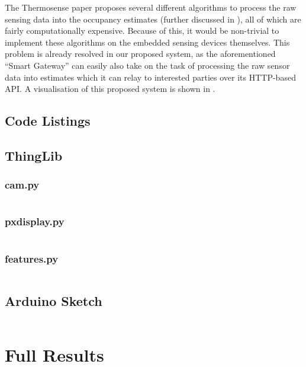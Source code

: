 The Thermosense paper \cite{beltran2013thermosense} proposes several different algorithms to process the raw sensing data into the occupancy estimates (further discussed in ), all of which are fairly computationally expensive. Because of this, it would be non-trivial to implement these algorithms on the embedded sensing devices themselves. This problem is already resolved in our proposed system, as the aforementioned ``Smart Gateway'' can easily also take on the task of processing the raw sensor data into estimates which it can relay to interested parties over its HTTP-based API. A visualisation of this proposed system is shown in .

\begin{landscape}
\chapter{Code Listings}


\section{ThingLib}
\subsection{cam.py}
\inputminted[fontsize=\footnotesize,breaklines=true,numbers=right]{python}{../../code/processing/thinglib/cam.py}
\subsection{pxdisplay.py}
\inputminted[fontsize=\footnotesize,breaklines=true,numbers=right]{python}{../../code/processing/thinglib/pxdisplay.py}
\subsection{features.py}
\inputminted[fontsize=\footnotesize,breaklines=true,numbers=right]{python}{../../code/processing/thinglib/features.py}

\section{Arduino Sketch}
\inputminted[fontsize=\footnotesize,breaklines=true,numbers=right]{C++}{../../code/mlx90620_driver/mlx90620_driver.ino}

\end{landscape}


\chapter{Full Results}

